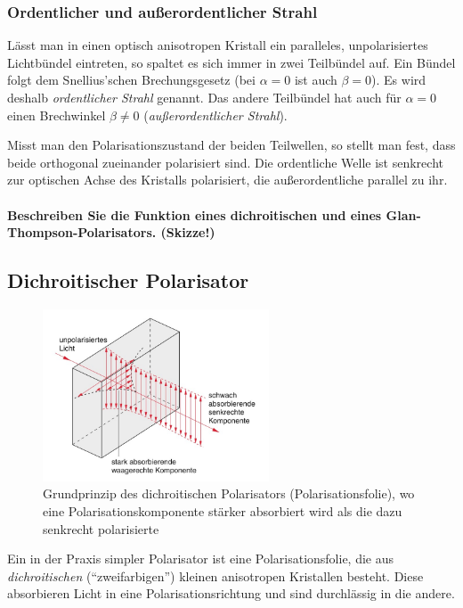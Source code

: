 \documentclass[a4paper, 11pt, ngerman, parskip=half-]{scrartcl}
\begin{document}
\subsubsection*{Ordentlicher und außerordentlicher Strahl}
%
Lässt man in einen optisch anisotropen Kristall ein paralleles, unpolarisiertes Lichtbündel eintreten, so spaltet es sich immer in zwei Teilbündel auf. Ein Bündel folgt dem Snellius'schen Brechungsgesetz (bei $\alpha = 0$ ist auch $\beta = 0$). Es wird deshalb \textit{ordentlicher Strahl} genannt. Das andere Teilbündel hat auch für $\alpha = 0$ einen Brechwinkel $\beta \neq 0$ (\textit{außerordentlicher Strahl}).

Misst man den Polarisationszustand der beiden Teilwellen, so stellt man fest, dass beide orthogonal zueinander polarisiert sind. Die ordentliche Welle ist senkrecht zur optischen Achse des Kristalls polarisiert, die außerordentliche parallel zu ihr.


\paragraph{Beschreiben Sie die Funktion eines dichroitischen und eines Glan-Thompson-Polarisators. (Skizze!)}
%
\subsection*{Dichroitischer Polarisator}
%
\begin{figure}[!h]
    \centering
    \begin{samepage}
        \includegraphics[width=0.6\textwidth]{image/15/dichroitische_folie.jpg}
        \caption{Grundprinzip des dichroitischen Polarisators (Polarisationsfolie), wo eine Polarisationskomponente stärker absorbiert wird als die dazu senkrecht polarisierte}
        \label{fig:dichroitischer_polarisator}
    \end{samepage}
\end{figure}
%
Ein in der Praxis simpler Polarisator ist eine Polarisationsfolie, die aus \textit{dichroitischen} (\enquote{zweifarbigen}) kleinen anisotropen Kristallen besteht. Diese absorbieren Licht in eine Polarisationsrichtung und sind durchlässig in die andere.
\end{document}
